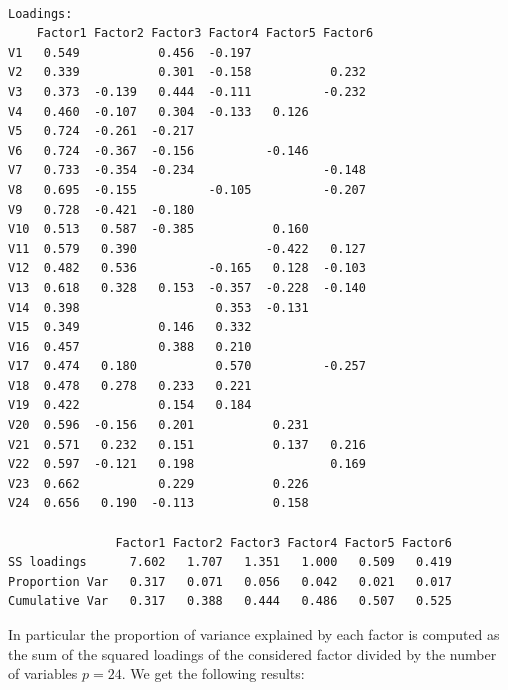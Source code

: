 \documentclass[
  letterpaper,
  DIV=11,
  numbers=noendperiod]{scrartcl}
\newenvironment{Shaded}{\begin{snugshade}}{\end{snugshade}}
\newcommand{\AttributeTok}[1]{\textcolor[rgb]{0.40,0.45,0.13}{#1}}
\newcommand{\DecValTok}[1]{\textcolor[rgb]{0.68,0.00,0.00}{#1}}
\newcommand{\FloatTok}[1]{\textcolor[rgb]{0.68,0.00,0.00}{#1}}
\newcommand{\FunctionTok}[1]{\textcolor[rgb]{0.28,0.35,0.67}{#1}}
\newcommand{\NormalTok}[1]{\textcolor[rgb]{0.00,0.23,0.31}{#1}}
\newcommand{\OtherTok}[1]{\textcolor[rgb]{0.00,0.23,0.31}{#1}}
\newcommand{\SpecialCharTok}[1]{\textcolor[rgb]{0.37,0.37,0.37}{#1}}
\newcommand{\StringTok}[1]{\textcolor[rgb]{0.13,0.47,0.30}{#1}}
\begin{document}
\begin{verbatim}

Loadings:
    Factor1 Factor2 Factor3 Factor4 Factor5 Factor6
V1   0.549           0.456  -0.197                 
V2   0.339           0.301  -0.158           0.232 
V3   0.373  -0.139   0.444  -0.111          -0.232 
V4   0.460  -0.107   0.304  -0.133   0.126         
V5   0.724  -0.261  -0.217                         
V6   0.724  -0.367  -0.156          -0.146         
V7   0.733  -0.354  -0.234                  -0.148 
V8   0.695  -0.155          -0.105          -0.207 
V9   0.728  -0.421  -0.180                         
V10  0.513   0.587  -0.385           0.160         
V11  0.579   0.390                  -0.422   0.127 
V12  0.482   0.536          -0.165   0.128  -0.103 
V13  0.618   0.328   0.153  -0.357  -0.228  -0.140 
V14  0.398                   0.353  -0.131         
V15  0.349           0.146   0.332                 
V16  0.457           0.388   0.210                 
V17  0.474   0.180           0.570          -0.257 
V18  0.478   0.278   0.233   0.221                 
V19  0.422           0.154   0.184                 
V20  0.596  -0.156   0.201           0.231         
V21  0.571   0.232   0.151           0.137   0.216 
V22  0.597  -0.121   0.198                   0.169 
V23  0.662           0.229           0.226         
V24  0.656   0.190  -0.113           0.158         

               Factor1 Factor2 Factor3 Factor4 Factor5 Factor6
SS loadings      7.602   1.707   1.351   1.000   0.509   0.419
Proportion Var   0.317   0.071   0.056   0.042   0.021   0.017
Cumulative Var   0.317   0.388   0.444   0.486   0.507   0.525
\end{verbatim}

In particular the proportion of variance explained by each factor is
computed as the sum of the squared loadings of the considered factor
divided by the number of variables \(p=24\). We get the following
results:

\begin{Shaded}
\end{Shaded}
\end{document}
